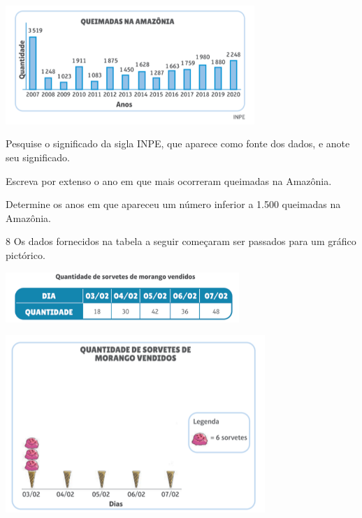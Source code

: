 \begin{mdframed}[linewidth=2pt,linecolor=salmao,roundcorner=2pt]
\begin{escolha}
{%

\includegraphics[width=3.71154in,height=1.76937in]{media/image99.png}

\begin{escolha}
\item
  Pesquise o significado da sigla INPE, que aparece como fonte dos dados,
  e anote seu significado.


\item
  Escreva por extenso o ano em que mais ocorreram queimadas na Amazônia.


\item
  Determine os anos em que apareceu um número inferior a 1.500 queimadas na
  Amazônia.

\end{escolha}


\num{8} Os dados fornecidos na tabela a seguir começaram ser passados para um
gráfico pictórico.

\includegraphics[width=3.47436in,height=0.75022in]{media/image100.png}

\includegraphics[width=3.86538in,height=2.63899in]{media/image101.png}

}
\end{escolha}
\end{mdframed}
